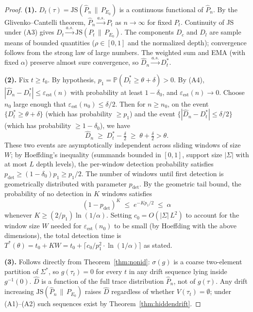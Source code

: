 \documentclass[11pt]{article}
\newcommand{\Sigstar}{\Sigma^{*}}
\newcommand{\Dhat}{\widehat{D}}
\newcommand{\sigg}{\sigma(g)}
\newcommand{\JS}{\mathrm{JS}}
\newcommand{\Prob}{\mathbb{P}}
\begin{document}
\begin{proof}
\textbf{(1).}
$D_t(\tau) = \JS(\hat{P}_n \,\|\, P_{E_0})$ is a continuous functional of
$\hat{P}_n$.  By the Glivenko--Cantelli theorem, $\hat{P}_n \xrightarrow{a.s.}
P_t$ as $n\to\infty$ for fixed $P_t$.  Continuity of JS under (A3) gives
$D_t \xrightarrow{a.s.} \JS(P_t \,\|\, P_{E_0})$.  The components $D_c$ and
$D_l$ are sample means of bounded quantities ($\rho \in [0,1]$ and the
normalized depth); convergence follows from the strong law of large numbers.
The weighted sum and EMA (with fixed $\alpha$) preserve almost sure
convergence, so $\Dhat_n \xrightarrow{a.s.} D_t^*$.

\textbf{(2).}
Fix $t \geq t_0$.  By hypothesis, $p_1 = \Prob(D_t^* \geq \theta + \delta) > 0$.
By (A4), $|\Dhat_n - D_t^*| \leq \varepsilon_{\mathrm{est}}(n)$ with
probability at least $1-\delta_0$, and $\varepsilon_{\mathrm{est}}(n) \to 0$.
Choose $n_0$ large enough that $\varepsilon_{\mathrm{est}}(n_0) \leq \delta/2$.
Then for $n \geq n_0$, on the event $\{D_t^* \geq \theta+\delta\}$ (which
has probability $\geq p_1$) and the event $\{|\Dhat_n - D_t^*| \leq \delta/2\}$
(which has probability $\geq 1-\delta_0$), we have
\[
  \Dhat_n \;\geq\; D_t^* - \tfrac{\delta}{2} \;\geq\; \theta + \tfrac{\delta}{2} > \theta.
\]
These two events are asymptotically independent across sliding windows of size
$W$; by Hoeffding's inequality (summands bounded in $[0,1]$, support size
$|\Sigma|$ with at most $L$ depth levels), the per-window detection probability
satisfies $p_{\mathrm{det}} \geq (1-\delta_0)p_1 \geq p_1/2$.  The number of
windows until first detection is geometrically distributed with parameter
$p_{\mathrm{det}}$.  By the geometric tail bound, the probability of no
detection in $K$ windows satisfies
\[
  (1 - p_{\mathrm{det}})^K \;\leq\; e^{-K p_1/2} \;\leq\; \alpha
\]
whenever $K \geq (2/p_1)\ln(1/\alpha)$.  Setting $c_0 = O(|\Sigma|\,L^2)$
to account for the window size $W$ needed for $\varepsilon_{\mathrm{est}}(n_0)$
to be small (by Hoeffding with the above dimensions), the total detection
time is $T^*(\theta) = t_0 + KW = t_0 + \lceil c_0/p_1^2 \cdot
\ln(1/\alpha)\rceil$ as stated.

\textbf{(3).}
Follows directly from Theorem~\ref{thm:nonid}: $\sigg$ is a coarse
two-element partition of $\Sigstar$, so $g(\tau_t) = 0$ for every $t$ in
any drift sequence lying inside $g^{-1}(0)$.  $\Dhat$ is a function of
the full trace distribution $\hat{P}_n$, not of $g(\tau)$.  Any drift
increasing $\JS(\hat{P}_n \,\|\, P_{E_0})$ raises $\Dhat$ regardless of
whether $V(\tau_t) = \emptyset$; under (A1)--(A2) such sequences exist by
Theorem~\ref{thm:hiddendrift}.
\end{proof}
\end{document}
